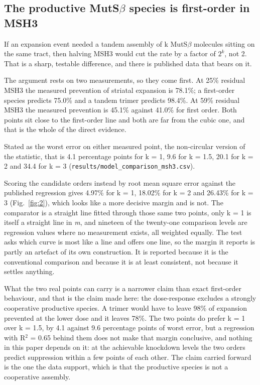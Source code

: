 \documentclass[conference]{IEEEtran}
\begin{document}
\subsection{The productive MutS$\beta$ species is first-order in MSH3}
\label{sec:3.2}
If an expansion event needed a tandem assembly of k MutS$\beta$ molecules sitting on the same tract, then halving MSH3 would cut the rate by a factor of $2^{k}$, not 2. That is a sharp, testable difference, and there is published data that bears on it.

The argument rests on two measurements, so they come first. At 25\% residual MSH3 the measured prevention of striatal expansion is 78.1\%; a first-order species predicts 75.0\% and a tandem trimer predicts 98.4\%. At 59\% residual MSH3 the measured prevention is 45.1\% against 41.0\% for first order. Both points sit close to the first-order line and both are far from the cubic one, and that is the whole of the direct evidence.

Stated as the worst error on either measured point, the non-circular version of the statistic, that is 4.1 percentage points for k = 1, 9.6 for k = 1.5, 20.1 for k = 2 and 34.4 for k = 3 (\texttt{results/\allowbreak{}model\_\allowbreak{}comparison\_\allowbreak{}msh3.\allowbreak{}csv}).

Scoring the candidate orders instead by root mean square error against the published regression gives 4.97\% for k = 1, 18.02\% for k = 2 and 26.43\% for k = 3 (Fig.~\ref{fig:2}), which looks like a more decisive margin and is not. The comparator is a straight line fitted through those same two points, only k = 1 is itself a straight line in \textit{m}, and nineteen of the twenty-one comparison levels are regression values where no measurement exists, all weighted equally. The test asks which curve is most like a line and offers one line, so the margin it reports is partly an artefact of its own construction. It is reported because it is the conventional comparison and because it is at least consistent, not because it settles anything.

What the two real points can carry is a narrower claim than exact first-order behaviour, and that is the claim made here: the dose-response excludes a strongly cooperative productive species. A trimer would have to leave 98\% of expansion prevented at the lower dose and it leaves 78\%. The two points do prefer k = 1 over k = 1.5, by 4.1 against 9.6 percentage points of worst error, but a regression with R$^{2}$ = 0.65 behind them does not make that margin conclusive, and nothing in this paper depends on it: at the achievable knockdown levels the two orders predict suppression within a few points of each other. The claim carried forward is the one the data support, which is that the productive species is not a cooperative assembly.
\end{document}
